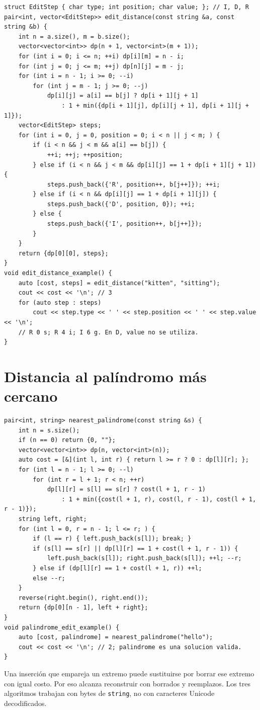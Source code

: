 \begin{lstlisting}[style=cpp]
struct EditStep { char type; int position; char value; }; // I, D, R
pair<int, vector<EditStep>> edit_distance(const string &a, const string &b) {
    int n = a.size(), m = b.size();
    vector<vector<int>> dp(n + 1, vector<int>(m + 1));
    for (int i = 0; i <= n; ++i) dp[i][m] = n - i;
    for (int j = 0; j <= m; ++j) dp[n][j] = m - j;
    for (int i = n - 1; i >= 0; --i)
        for (int j = m - 1; j >= 0; --j)
            dp[i][j] = a[i] == b[j] ? dp[i + 1][j + 1]
                : 1 + min({dp[i + 1][j], dp[i][j + 1], dp[i + 1][j + 1]});
    vector<EditStep> steps;
    for (int i = 0, j = 0, position = 0; i < n || j < m; ) {
        if (i < n && j < m && a[i] == b[j]) {
            ++i; ++j; ++position;
        } else if (i < n && j < m && dp[i][j] == 1 + dp[i + 1][j + 1]) {
            steps.push_back({'R', position++, b[j++]}); ++i;
        } else if (i < n && dp[i][j] == 1 + dp[i + 1][j]) {
            steps.push_back({'D', position, 0}); ++i;
        } else {
            steps.push_back({'I', position++, b[j++]});
        }
    }
    return {dp[0][0], steps};
}
void edit_distance_example() {
    auto [cost, steps] = edit_distance("kitten", "sitting");
    cout << cost << '\n'; // 3
    for (auto step : steps)
        cout << step.type << ' ' << step.position << ' ' << step.value << '\n';
    // R 0 s; R 4 i; I 6 g. En D, value no se utiliza.
}
\end{lstlisting}

\section{Distancia al pal\'indromo m\'as cercano}

\begin{lstlisting}[style=cpp]
pair<int, string> nearest_palindrome(const string &s) {
    int n = s.size();
    if (n == 0) return {0, ""};
    vector<vector<int>> dp(n, vector<int>(n));
    auto cost = [&](int l, int r) { return l >= r ? 0 : dp[l][r]; };
    for (int l = n - 1; l >= 0; --l)
        for (int r = l + 1; r < n; ++r)
            dp[l][r] = s[l] == s[r] ? cost(l + 1, r - 1)
                : 1 + min({cost(l + 1, r), cost(l, r - 1), cost(l + 1, r - 1)});
    string left, right;
    for (int l = 0, r = n - 1; l <= r; ) {
        if (l == r) { left.push_back(s[l]); break; }
        if (s[l] == s[r] || dp[l][r] == 1 + cost(l + 1, r - 1)) {
            left.push_back(s[l]); right.push_back(s[l]); ++l; --r;
        } else if (dp[l][r] == 1 + cost(l + 1, r)) ++l;
        else --r;
    }
    reverse(right.begin(), right.end());
    return {dp[0][n - 1], left + right};
}
void palindrome_edit_example() {
    auto [cost, palindrome] = nearest_palindrome("hello");
    cout << cost << '\n'; // 2; palindrome es una solucion valida.
}
\end{lstlisting}

Una inserci\'on que empareja un extremo puede sustituirse por borrar ese
extremo con igual costo. Por eso alcanza reconstruir con borrados y reemplazos.
Los tres algoritmos trabajan con bytes de \texttt{string}, no con caracteres
Unicode decodificados.
